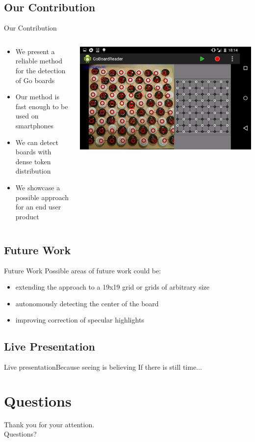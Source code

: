 \documentclass[table]{beamer}
\begin{document}
\subsection{Our Contribution}
\begin{frame}{Our Contribution}
	\begin{columns}
		\begin{column}{0.5\textwidth}
			\begin{itemize}
				\item We present a reliable method for the detection of Go boards
				\item Our method is fast enough to be used on smartphones
				\item We can detect boards with dense token distribution
				\item We showcase a possible approach for an end user product
			\end{itemize}
		\end{column}
		\begin{column}{0.4\textwidth}
			\includegraphics[width=\columnwidth]{images/android_perfect_recognition.png}
		\end{column}
	\end{columns}
\end{frame}
\subsection{Future Work}
\begin{frame}{Future Work}
	Possible areas of future work could be:
	\begin{itemize}
		\item extending the approach to a 19x19 grid or grids of arbitrary size
		\item autonomously detecting the center of the board
		\item improving correction of specular highlights
	\end{itemize}
\end{frame}

\subsection{Live Presentation}
\begin{frame}{Live presentation}{Because seeing is believing}
	\centering
	If there is still time...
\end{frame}

\section*{Questions}
\begin{frame}
	\centering
  \huge Thank you for your attention.\\[1.5cm] Questions?
\end{frame}
\end{document}
